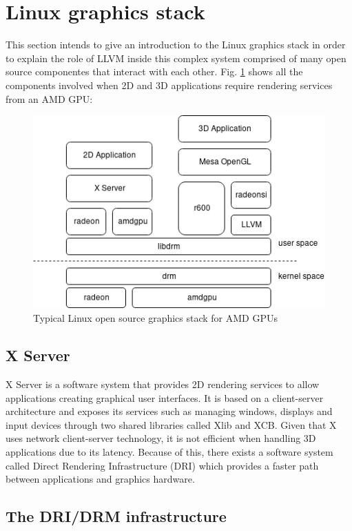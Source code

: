 \documentclass[12pt,a4paper,oneside]{article}
\begin{document}
\newpage
\section{Linux graphics stack} \label{Linux graphics stack}

This section intends to give an introduction to the Linux graphics stack in order
to explain the role of LLVM inside this complex system comprised of many open
source componentes that interact with each other. Fig. \ref{fig:stack} shows all
the components involved when 2D and 3D applications require rendering services
from an AMD GPU:
\begin{figure}[H]
\centering
  \includegraphics[scale=0.75]{img/stack.png}
  \caption{Typical Linux open source graphics stack for AMD GPUs}
  \label{fig:stack}
\end{figure}

\subsection{X Server}

X Server is a software system that provides 2D rendering services to allow
applications creating graphical user interfaces. It is based on a client-server
architecture and exposes its services such as managing windows, displays and
input devices through two shared libraries called Xlib and XCB. Given that X uses
network client-server technology, it is not efficient when handling 3D applications
due to its latency. Because of this, there exists a software system called Direct
Rendering Infrastructure (DRI) which provides a faster path between applications
and graphics hardware.

\subsection{The DRI/DRM infrastructure}
\end{document}
